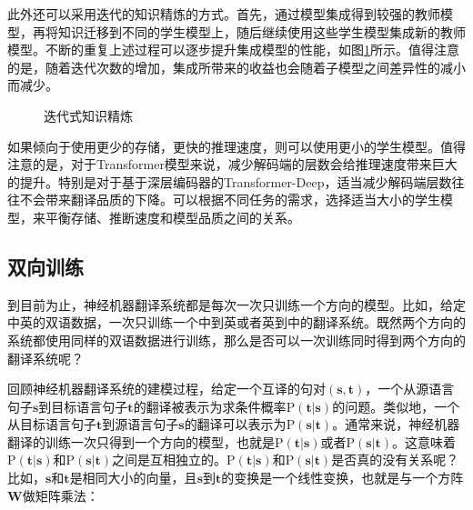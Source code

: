 \parinterval 此外还可以采用迭代的知识精炼的方式。首先，通过模型集成得到较强的教师模型，再将知识迁移到不同的学生模型上，随后继续使用这些学生模型集成新的教师模型。不断的重复上述过程可以逐步提升集成模型的性能，如图\ref{fig:7-42}所示。值得注意的是，随着迭代次数的增加，集成所带来的收益也会随着子模型之间差异性的减小而减少。

\begin{figure}[htp]
\centering

\caption{迭代式知识精炼}
\label{fig:7-42}
\end{figure}

\parinterval 如果倾向于使用更少的存储，更快的推理速度，则可以使用更小的学生模型。值得注意的是，对于Transformer模型来说，减少解码端的层数会给推理速度带来巨大的提升。特别是对于基于深层编码器的Transformer-Deep，适当减少解码端层数往往不会带来翻译品质的下降。可以根据不同任务的需求，选择适当大小的学生模型，来平衡存储、推断速度和模型品质之间的关系。


\subsection{双向训练}
\label{subsection-7.5.4}

\parinterval 到目前为止，神经机器翻译系统都是每次一次只训练一个方向的模型。比如，给定中英的双语数据，一次只训练一个中到英或者英到中的翻译系统。既然两个方向的系统都使用同样的双语数据进行训练，那么是否可以一次训练同时得到两个方向的翻译系统呢？

\parinterval 回顾神经机器翻译系统的建模过程，给定一个互译的句对$(\mathbf s,\mathbf t)$，一个从源语言句子$\mathbf s$到目标语言句子$\mathbf t$的翻译被表示为求条件概率$\textrm{P}(\mathbf t|\mathbf s)$的问题。类似地，一个从目标语言句子$\mathbf t$到源语言句子$\mathbf s$的翻译可以表示为$\textrm{P}(\mathbf s|\mathbf t)$。通常来说，神经机器翻译的训练一次只得到一个方向的模型，也就是$\textrm{P}(\mathbf t|\mathbf s)$或者$\textrm{P}(\mathbf s|\mathbf t)$。这意味着$\textrm{P}(\mathbf t|\mathbf s)$和$\textrm{P}(\mathbf s|\mathbf t)$之间是互相独立的。$\textrm{P}(\mathbf t|\mathbf s)$和$\textrm{P}(\mathbf s|\mathbf t)$是否真的没有关系呢？比如，$\mathbf s$和$\mathbf t$是相同大小的向量，且$\mathbf s$到$\mathbf t$的变换是一个线性变换，也就是与一个方阵$\mathbf{W}$做矩阵乘法：


